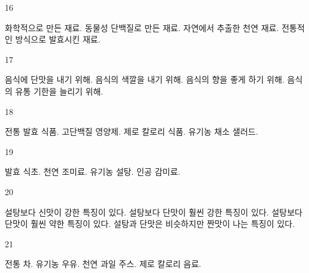 \documentclass[fs9,seriesFre]{korfarm-base}
\begin{document}
\begin{kfSentenceUnit}{16}{}
\begin{kfChoices}
\kfChoice 화학적으로 만든 재료.
\kfChoice 동물성 단백질로 만든 재료.
\kfChoice 자연에서 추출한 천연 재료.
\kfChoice 전통적인 방식으로 발효시킨 재료.
\end{kfChoices}
\end{kfSentenceUnit}

\begin{kfSentenceUnit}{17}{}
\begin{kfChoices}
\kfChoice 음식에 단맛을 내기 위해.
\kfChoice 음식의 색깔을 내기 위해.
\kfChoice 음식의 향을 좋게 하기 위해.
\kfChoice 음식의 유통 기한을 늘리기 위해.
\end{kfChoices}
\end{kfSentenceUnit}

\begin{kfSentenceUnit}{18}{}
\begin{kfChoices}
\kfChoice 전통 발효 식품.
\kfChoice 고단백질 영양제.
\kfChoice 제로 칼로리 식품.
\kfChoice 유기농 채소 샐러드.
\end{kfChoices}
\end{kfSentenceUnit}

\begin{kfSentenceUnit}{19}{}
\begin{kfChoices}
\kfChoice 발효 식초.
\kfChoice 천연 조미료.
\kfChoice 유기농 설탕.
\kfChoice 인공 감미료.
\end{kfChoices}
\end{kfSentenceUnit}

\begin{kfSentenceUnit}{20}{}
\begin{kfChoices}
\kfChoice 설탕보다 신맛이 강한 특징이 있다.
\kfChoice 설탕보다 단맛이 훨씬 강한 특징이 있다.
\kfChoice 설탕보다 단맛이 훨씬 약한 특징이 있다.
\kfChoice 설탕과 단맛은 비슷하지만 짠맛이 나는 특징이 있다.
\end{kfChoices}
\end{kfSentenceUnit}

\begin{kfSentenceUnit}{21}{}
\begin{kfChoices}
\kfChoice 전통 차.
\kfChoice 유기농 우유.
\kfChoice 천연 과일 주스.
\kfChoice 제로 칼로리 음료.
\end{kfChoices}
\end{kfSentenceUnit}
\end{document}
